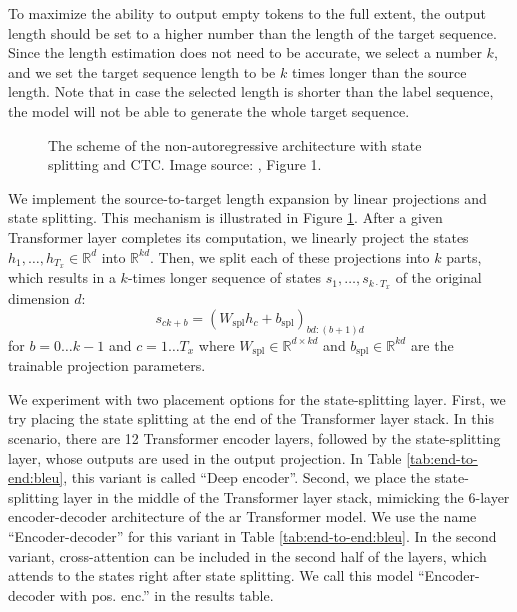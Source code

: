 To maximize the ability to output empty tokens to the full extent, the output
length should be set to a higher number than the length of the target sequence.
Since the length estimation does not need to be accurate, we select a number
$k$, and we set the target sequence length to be $k$ times longer than the
source length. Note that in case the selected length is shorter than the label
sequence, the model will not be able to generate the whole target sequence.

\begin{figure}
  \centering
  

  \caption{The scheme of the non-autoregressive architecture with
    state splitting and CTC. Image source: \citet{libovicky-helcl-2018-end},
    Figure 1.}%
  \label{fig:state-splitting}
\end{figure}


We implement the source-to-target length expansion by linear projections and
state splitting. This mechanism is illustrated in Figure
\ref{fig:state-splitting}. After a given Transformer layer completes its
computation, we linearly project the states
$h_1, \ldots, h_{T_x} \in \mathbb{R}^d$ into $\mathbb{R}^{kd}$. Then, we split
each of these projections into $k$ parts, which results in a $k$-times longer
sequence of states $s_1, \ldots, s_{k \cdot T_x}$ of the original dimension
$d$:
%
\begin{equation}
  s_{ck+b} = \left( W_{\text{spl}} h_c + b_{\text{spl}} \right)_{bd:(b+1)d}
\end{equation}
%
for $b=0 \ldots k-1$ and $c=1 \ldots T_x$ where
$W_{\text{spl}} \in \mathbb{R}^{d \times kd}$ and
$b_{\text{spl}} \in \mathbb{R}^{kd}$ are the trainable projection parameters.

We experiment with two placement options for the state-splitting layer. First,
we try placing the state splitting at the end of the Transformer layer
stack. In this scenario, there are 12 Transformer encoder layers, followed by
the state-splitting layer, whose outputs are used in the output projection. In
Table \ref{tab:end-to-end:bleu}, this variant is called ``Deep
encoder''. Second, we place the state-splitting layer in the middle of the
Transformer layer stack, mimicking the 6-layer encoder-decoder architecture of
the \ac{ar} Transformer model. We use the name ``Encoder-decoder'' for this
variant in Table \ref{tab:end-to-end:bleu}. In the second variant,
cross-attention can be included in the second half of the layers, which attends
to the states right after state splitting. We call this model ``Encoder-decoder
with pos. enc.'' in the results table.

